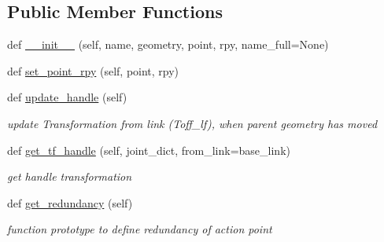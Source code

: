 \subsection*{Public Member Functions}
\begin{DoxyCompactItemize}
\item 
def \hyperlink{classrnb-planning_1_1src_1_1pkg_1_1planning_1_1constraint_1_1constraint__common_1_1_action_point_a06d29c3fecfe39a84408c6dea115ef60}{\+\_\+\+\_\+init\+\_\+\+\_\+} (self, name, geometry, point, rpy, name\+\_\+full=None)
\item 
def \hyperlink{classrnb-planning_1_1src_1_1pkg_1_1planning_1_1constraint_1_1constraint__common_1_1_action_point_a294d217f9163806e03652943931742f2}{set\+\_\+point\+\_\+rpy} (self, point, rpy)
\item 
\mbox{\label{classrnb-planning_1_1src_1_1pkg_1_1planning_1_1constraint_1_1constraint__common_1_1_action_point_af0e77be2f376763cf4da759b34a58509}} 
def \hyperlink{classrnb-planning_1_1src_1_1pkg_1_1planning_1_1constraint_1_1constraint__common_1_1_action_point_af0e77be2f376763cf4da759b34a58509}{update\+\_\+handle} (self)
\begin{DoxyCompactList}\small\item\em update Transformation from link (Toff\+\_\+lf), when parent geometry has moved \end{DoxyCompactList}\item 
def \hyperlink{classrnb-planning_1_1src_1_1pkg_1_1planning_1_1constraint_1_1constraint__common_1_1_action_point_abf49647c397c65245efac8cf6b4fc39b}{get\+\_\+tf\+\_\+handle} (self, joint\+\_\+dict, from\+\_\+link=\textquotesingle{}base\+\_\+link\textquotesingle{})
\begin{DoxyCompactList}\small\item\em get handle transformation \end{DoxyCompactList}\item 
\mbox{\label{classrnb-planning_1_1src_1_1pkg_1_1planning_1_1constraint_1_1constraint__common_1_1_action_point_a3ac4bede1f69392c2be86429ed8a5c1a}} 
def \hyperlink{classrnb-planning_1_1src_1_1pkg_1_1planning_1_1constraint_1_1constraint__common_1_1_action_point_a3ac4bede1f69392c2be86429ed8a5c1a}{get\+\_\+redundancy} (self)
\begin{DoxyCompactList}\small\item\em function prototype to define redundancy of action point \end{DoxyCompactList}\end{DoxyCompactItemize}
